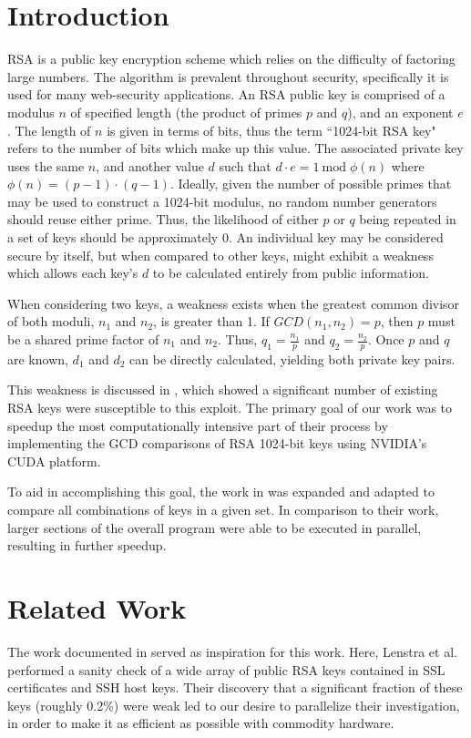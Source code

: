 \documentclass[10pt, conference]{./IEEEtran}
\begin{document}
\section{Introduction}
RSA is a public key encryption scheme which relies on the difficulty of 
factoring large numbers. The algorithm is prevalent throughout security, 
specifically it is used for many web-security applications. An RSA public key is 
comprised of a modulus $n$ of specified length (the product of primes $p$ and 
$q$), and an exponent $e$. The length of $n$ is given in terms of bits, thus 
the term ``1024-bit RSA key" refers to the number of bits which make up this 
value. The associated private key uses the same $n$, and another value $d$ such 
that $d \cdot e = 1 \:\text{mod} \;\phi(n)$ where $\phi(n) = (p - 1) \cdot (q - 1)$\cite{rsa}.
Ideally, given the number of possible primes that may be used to construct a 
1024-bit modulus, no random number generators should reuse either prime. Thus, 
the likelihood of either $p$ or $q$ being repeated in a set of keys should be 
approximately 0. An individual key may be considered secure by itself, but when 
compared to other keys, might exhibit a weakness which allows each key's 
$d$ to be calculated entirely from public information.

When considering two keys, a weakness exists when the greatest common 
divisor of both moduli, $n_1$ and $n_2$, is greater than 1. If $GCD(n_1, 
n_2) = p$, then $p$ must be a shared prime factor of $n_1$ and $n_2$. Thus, 
$q_1 = \frac{n_1}{p}$ and $q_2 = \frac{n_2}{p}$. Once $p$ and $q$ are known, 
$d_1$ and $d_2$ can be directly calculated, yielding both private key pairs.

This weakness is discussed in \cite{lenstra:ron}, which showed a 
significant number of existing RSA keys were susceptible to this exploit. The 
primary goal of our work was to speedup the most computationally intensive 
part of their process by implementing the GCD comparisons of RSA 1024-bit keys 
using NVIDIA's CUDA platform.

To aid in accomplishing this goal, the work in \cite{fujimoto2009high} was 
expanded and adapted to compare all combinations of keys in a given set. In 
comparison to their work, larger sections of the overall program were able to 
be executed in parallel, resulting in further speedup.

\section{Related Work}
The work documented in \cite{lenstra:ron} served as inspiration for this work.
Here, Lenstra et al. performed a sanity check of a wide array of public RSA keys 
contained in SSL certificates and SSH host keys. Their discovery that a 
significant fraction of these keys (roughly 0.2\%) were weak led to our 
desire to parallelize their investigation, in order to make it as efficient as 
possible with commodity hardware. 
\end{document}
